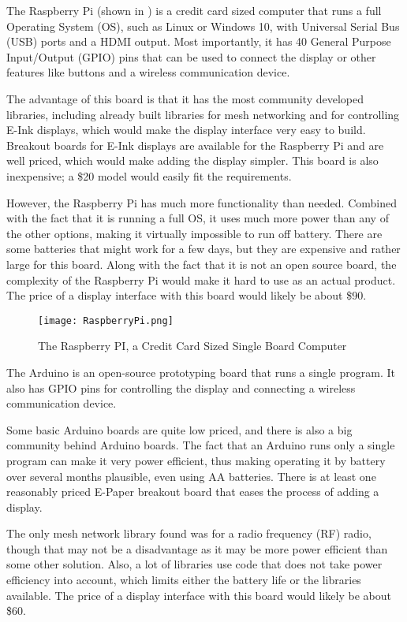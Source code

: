 \documentclass[PPFS.tex]{template/subfiles}
\begin{document}
The Raspberry Pi (shown in ) is a credit card sized computer that runs a full Operating System (OS), such as Linux or Windows 10, with Universal Serial Bus (USB) ports and a HDMI output. Most importantly, it has 40 General Purpose Input/Output (GPIO) pins that can be used to connect the display or other features like buttons and a wireless communication device.

The advantage of this board is that it has the most community developed libraries, including already built libraries for mesh networking and for controlling E-Ink displays, which would make the display interface very easy to build. Breakout boards for E-Ink displays are available for the Raspberry Pi and are well priced, which would make adding the display simpler. This board is also inexpensive; a \$20 model would easily fit the requirements.

However, the Raspberry Pi has much more functionality than needed. Combined with the fact that it is running a full OS, it uses much more power than any of the other options, making it virtually impossible to run off battery. There are some batteries that might work for a few days, but they are expensive and rather large for this board. Along with the fact that it is not an open source board, the complexity of the Raspberry Pi would make it hard to use as an actual product. The price of a display interface with this board would likely be about \$90.

\begin{figure}[h]
	\centering
	\texttt{[image: RaspberryPi.png]}
	\caption{The Raspberry PI, a Credit Card Sized Single Board Computer}
	\label{fig:raspberryPi}
\end{figure}

The Arduino is an open-source prototyping board that runs a single program. It also has GPIO pins for controlling the display and connecting a wireless communication device.

Some basic Arduino boards are quite low priced, and there is also a big community behind Arduino boards. The fact that an Arduino runs only a single program can make it very power efficient, thus making operating it by battery over several months plausible, even using AA batteries. There is at least one reasonably priced E-Paper breakout board that eases the process of adding a display.

The only mesh network library found was for a radio frequency (RF) radio, though that may not be a disadvantage as it may be more power efficient than some other solution. Also, a lot of libraries use code that does not take power efficiency into account, which limits either the battery life or the libraries available. The price of a display interface with this board would likely be about \$60.
\end{document}
